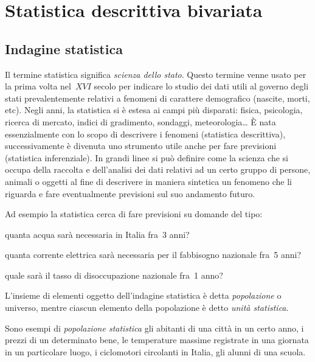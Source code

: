 
\chapter{Statistica descrittiva bivariata}

\section{Indagine statistica}
\label{sec:A_indagine}

Il termine statistica significa \emph{scienza dello stato}. Questo termine 
venne usato per la prima volta nel~$XVI$ secolo
per indicare lo studio dei dati utili al governo degli stati 
prevalentemente relativi a fenomeni di carattere demografico (nascite, 
morti, etc).
Negli anni, la statistica si è estesa ai campi più disparati: fisica, 
psicologia, ricerca di mercato, indici di gradimento, sondaggi, 
meteorologia\ldots
È nata essenzialmente con lo scopo di descrivere i fenomeni (statistica 
descrittiva), successivamente è divenuta uno strumento utile
anche per fare previsioni (statistica inferenziale). In grandi linee si può 
definire come la scienza che si occupa della raccolta e dell'analisi dei 
dati relativi
ad un certo gruppo di persone, animali o oggetti al fine di descrivere in 
maniera sintetica un fenomeno che li riguarda e fare eventualmente 
previsioni sul suo andamento futuro.

Ad esempio la statistica cerca di fare previsioni su domande del tipo:
\begin{itemize*}
\item quanta acqua sarà necessaria in Italia fra~3 anni?
\item quanta corrente elettrica sarà necessaria per il fabbisogno nazionale 
fra~5 anni?
\item quale sarà il tasso di disoccupazione nazionale fra~1 anno?
\end{itemize*}

\begin{definizione}
L'insieme di elementi oggetto dell'indagine statistica è detta 
\emph{popolazione} o universo, mentre ciascun elemento della popolazione è 
detto \emph{unità statistica}.
\end{definizione}

Sono esempi di \emph{popolazione statistica} gli abitanti di una città in 
un certo anno, i prezzi di un determinato bene, le temperature massime 
registrate
in una giornata in un particolare luogo, i ciclomotori circolanti in 
Italia, gli alunni di una scuola.

